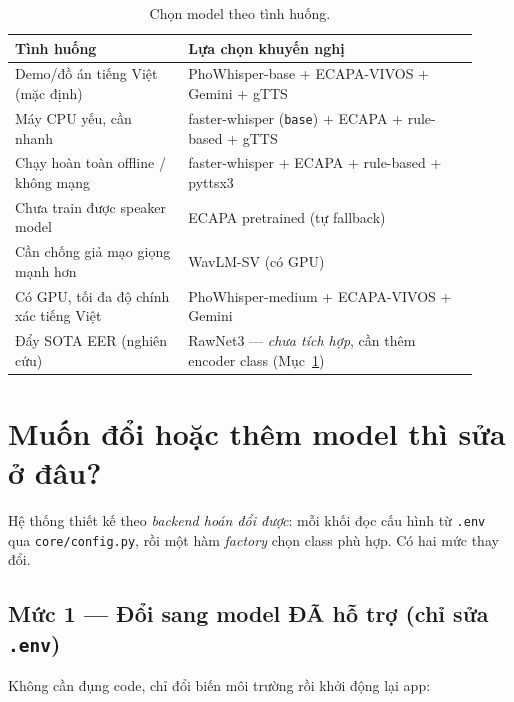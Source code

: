 \documentclass[12pt,a4paper]{article}
\begin{document}
\begin{table}[H]
\centering
\caption{Chọn model theo tình huống.}
\small
\begin{tabular}{p{0.34\linewidth}p{0.58\linewidth}}
\toprule
\textbf{Tình huống} & \textbf{Lựa chọn khuyến nghị} \\
\midrule
Demo/đồ án tiếng Việt (mặc định) & PhoWhisper-base + ECAPA-VIVOS + Gemini + gTTS \\
Máy CPU yếu, cần nhanh & faster-whisper (\texttt{base}) + ECAPA + rule-based + gTTS \\
Chạy hoàn toàn offline / không mạng & faster-whisper + ECAPA + rule-based + pyttsx3 \\
Chưa train được speaker model & ECAPA pretrained (tự fallback) \\
Cần chống giả mạo giọng mạnh hơn & WavLM-SV (có GPU) \\
Có GPU, tối đa độ chính xác tiếng Việt & PhoWhisper-medium + ECAPA-VIVOS + Gemini \\
Đẩy SOTA EER (nghiên cứu) & RawNet3 --- \emph{chưa tích hợp}, cần thêm encoder class (Mục~\ref{sec:doimodel}) \\
\bottomrule
\end{tabular}
\end{table}

\section{Muốn đổi hoặc thêm model thì sửa ở đâu?}
\label{sec:doimodel}
Hệ thống thiết kế theo \emph{backend hoán đổi được}: mỗi khối đọc cấu hình từ
\texttt{.env} qua \texttt{core/config.py}, rồi một hàm \emph{factory} chọn class
phù hợp. Có hai mức thay đổi.

\subsection{Mức 1 --- Đổi sang model ĐÃ hỗ trợ (chỉ sửa \texttt{.env})}
Không cần đụng code, chỉ đổi biến môi trường rồi khởi động lại app:
\end{document}
